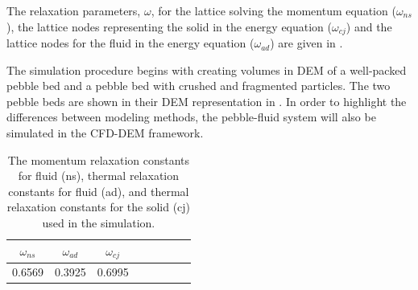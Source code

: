 The relaxation parameters, $\omega$, for the lattice solving the momentum equation ($\omega_{ns}$), the lattice nodes representing the solid in the energy equation ($\omega_{cj}$) and the lattice nodes for the fluid in the energy equation ($\omega_{ad}$) are given in .

The simulation procedure begins with creating volumes in DEM of a well-packed pebble bed and a pebble bed with crushed and fragmented particles. The two pebble beds are shown in their DEM representation in . In order to highlight the differences between modeling methods, the pebble-fluid system will also be simulated in the CFD-DEM framework. 


\begin {table}[ht] %
\caption{The momentum relaxation constants for fluid (ns), thermal relaxation constants for fluid (ad), and thermal relaxation constants for the solid (cj) used in the simulation.}
\label{tab:lbm-relaxations} \centering %
\begin {tabular}{ cccccccc }
\toprule %
$\omega_{ns}$ &  $\omega_{ad}$  &   $\omega_{cj}$     \\\toprule
0.6569      &  0.3925       &   0.6995         \\\bottomrule
\end{tabular}
\end{table}

